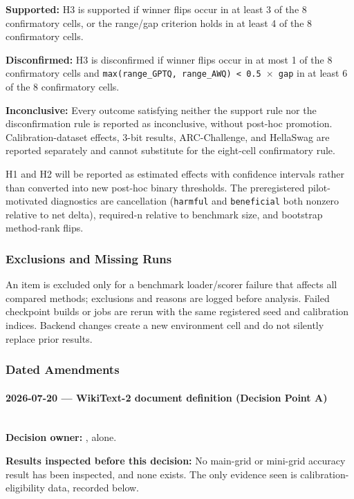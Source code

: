 \textbf{Supported:} H3 is supported if winner flips occur in at least 3 of the 8 confirmatory cells, or the range/gap criterion holds in at least 4 of the 8 confirmatory cells.

\textbf{Disconfirmed:} H3 is disconfirmed if winner flips occur in at most 1 of the 8 confirmatory cells and \texttt{max(range\_GPTQ, range\_AWQ) < 0.5 $\times$ gap} in at least 6 of the 8 confirmatory cells.

\textbf{Inconclusive:} Every outcome satisfying neither the support rule nor the disconfirmation rule is reported as inconclusive, without post-hoc promotion. Calibration-dataset effects, 3-bit results, ARC-Challenge, and HellaSwag are reported separately and cannot substitute for the eight-cell confirmatory rule.

H1 and H2 will be reported as estimated effects with confidence intervals rather than converted into new post-hoc binary thresholds. The preregistered pilot-motivated diagnostics are cancellation (\texttt{harmful} and \texttt{beneficial} both nonzero relative to net delta), required-n relative to benchmark size, and bootstrap method-rank flips.

\subsubsection{Exclusions and Missing Runs}
An item is excluded only for a benchmark loader/scorer failure that affects all compared methods; exclusions and reasons are logged before analysis. Failed checkpoint builds or jobs are rerun with the same registered seed and calibration indices. Backend changes create a new environment cell and do not silently replace prior results.

\subsubsection{Dated Amendments}
\paragraph{2026-07-20 --- WikiText-2 document definition (Decision Point A)}
\mbox{}\\
\textbf{Decision owner:} \authorname{}, alone.

\textbf{Results inspected before this decision:} No main-grid or mini-grid accuracy result has been inspected, and none exists. The only evidence seen is calibration-eligibility data, recorded below.

